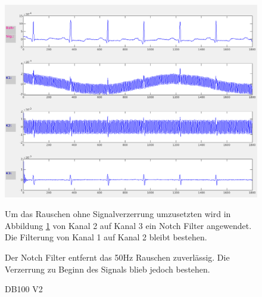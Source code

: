\documentclass[a4paper,12pt,titlepage]{scrartcl}
\begin{document}
\cleardoublepage

\begin{figure}[ht]
    \begin{minipage}[t]{0.5\linewidth}
        \centering
        \includegraphics[width=0.9\linewidth, valign=t]{Assets/LaborBMT-15-27-08.png}
        \caption{DB100 V2}
        \label{db100v2}
    \end{minipage}%
    \begin{minipage}[t]{0.5\linewidth}
        Um das Rauschen ohne Signalverzerrung umzusetzten wird in Abbildung \ref{db100v2} von Kanal 2 auf Kanal 3 ein Notch Filter angewendet. Die Filterung von Kanal 1 auf Kanal 2 bleibt bestehen.

        Der Notch Filter entfernt das 50Hz Rauschen zuverlässig. Die Verzerrung zu Beginn des Signals blieb jedoch bestehen.
    \end{minipage}
\end{figure}
\end{document}
